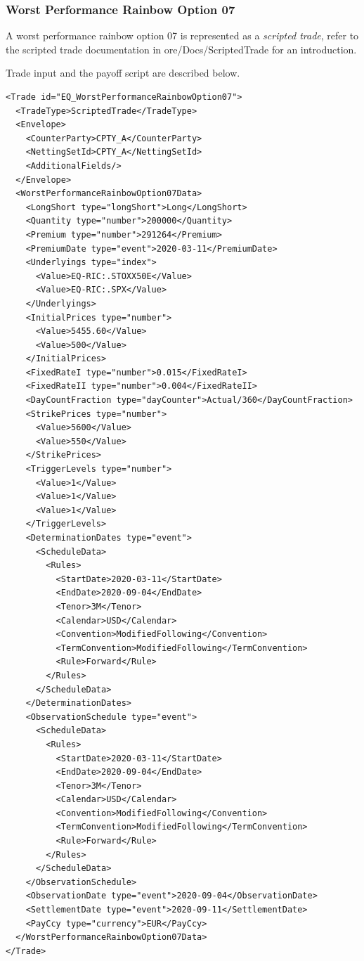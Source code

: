 \subsubsection*{Worst Performance Rainbow Option 07}

A worst performance rainbow option 07 is represented as a {\em scripted trade},
refer to the scripted trade documentation in ore/Docs/ScriptedTrade
for an introduction.

Trade input and the payoff script are described below.

\begin{verbatim}
<Trade id="EQ_WorstPerformanceRainbowOption07">
  <TradeType>ScriptedTrade</TradeType>
  <Envelope>
    <CounterParty>CPTY_A</CounterParty>
    <NettingSetId>CPTY_A</NettingSetId>
    <AdditionalFields/>
  </Envelope>
  <WorstPerformanceRainbowOption07Data>
    <LongShort type="longShort">Long</LongShort>
    <Quantity type="number">200000</Quantity>
    <Premium type="number">291264</Premium>
    <PremiumDate type="event">2020-03-11</PremiumDate>
    <Underlyings type="index">
      <Value>EQ-RIC:.STOXX50E</Value>
      <Value>EQ-RIC:.SPX</Value>
    </Underlyings>
    <InitialPrices type="number">
      <Value>5455.60</Value>
      <Value>500</Value>
    </InitialPrices>
    <FixedRateI type="number">0.015</FixedRateI>
    <FixedRateII type="number">0.004</FixedRateII>
    <DayCountFraction type="dayCounter">Actual/360</DayCountFraction>
    <StrikePrices type="number">
      <Value>5600</Value>
      <Value>550</Value>
    </StrikePrices>
    <TriggerLevels type="number">
      <Value>1</Value>
      <Value>1</Value>
      <Value>1</Value>
    </TriggerLevels>
    <DeterminationDates type="event">
      <ScheduleData>
        <Rules>
          <StartDate>2020-03-11</StartDate>
          <EndDate>2020-09-04</EndDate>
          <Tenor>3M</Tenor>
          <Calendar>USD</Calendar>
          <Convention>ModifiedFollowing</Convention>
          <TermConvention>ModifiedFollowing</TermConvention>
          <Rule>Forward</Rule>
        </Rules>
      </ScheduleData>
    </DeterminationDates>
    <ObservationSchedule type="event">
      <ScheduleData>
        <Rules>
          <StartDate>2020-03-11</StartDate>
          <EndDate>2020-09-04</EndDate>
          <Tenor>3M</Tenor>
          <Calendar>USD</Calendar>
          <Convention>ModifiedFollowing</Convention>
          <TermConvention>ModifiedFollowing</TermConvention>
          <Rule>Forward</Rule>
        </Rules>
      </ScheduleData>
    </ObservationSchedule>
    <ObservationDate type="event">2020-09-04</ObservationDate>
    <SettlementDate type="event">2020-09-11</SettlementDate>
    <PayCcy type="currency">EUR</PayCcy>
  </WorstPerformanceRainbowOption07Data>
</Trade>
\end{verbatim}

